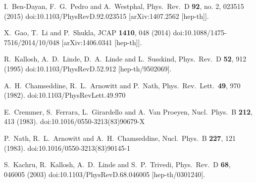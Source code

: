 \documentclass[12pt]{article}
\begin{document}
\begin{thebibliography}{99}
  I.~Ben-Dayan, F.~G.~Pedro and A.~Westphal,
  Phys.\ Rev.\ D {\bf 92}, no. 2, 023515 (2015)
  doi:10.1103/PhysRevD.92.023515
  [arXiv:1407.2562 [hep-th]].


  X.~Gao, T.~Li and P.~Shukla,
  JCAP {\bf 1410}, 048 (2014)
  doi:10.1088/1475-7516/2014/10/048
  [arXiv:1406.0341 [hep-th]].


  R.~Kallosh, A.~D.~Linde, D.~A.~Linde and L.~Susskind,
  Phys.\ Rev.\ D {\bf 52}, 912 (1995)
  doi:10.1103/PhysRevD.52.912
  [hep-th/9502069].


  A.~H.~Chamseddine, R.~L.~Arnowitt and P.~Nath,
  Phys.\ Rev.\ Lett.\  {\bf 49}, 970 (1982).
  doi:10.1103/PhysRevLett.49.970


  E.~Cremmer, S.~Ferrara, L.~Girardello and A.~Van Proeyen,
  Nucl.\ Phys.\ B {\bf 212}, 413 (1983).
  doi:10.1016/0550-3213(83)90679-X


  P.~Nath, R.~L.~Arnowitt and A.~H.~Chamseddine,
  Nucl.\ Phys.\ B {\bf 227}, 121 (1983).
  doi:10.1016/0550-3213(83)90145-1


  S.~Kachru, R.~Kallosh, A.~D.~Linde and S.~P.~Trivedi,
  Phys.\ Rev.\ D {\bf 68}, 046005 (2003)
  doi:10.1103/PhysRevD.68.046005
  [hep-th/0301240].



\end{thebibliography}
\end{document}
